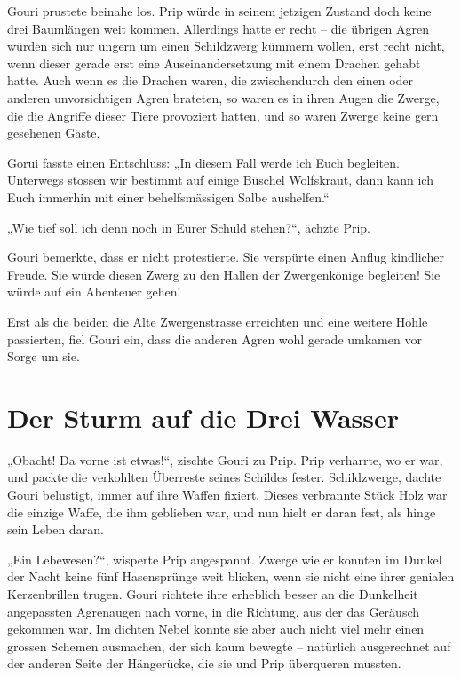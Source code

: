 Gouri prustete beinahe los. Prip würde in seinem jetzigen Zustand doch keine drei Baumlängen weit kommen. Allerdings hatte er recht – die übrigen Agren würden sich nur ungern um einen Schildzwerg kümmern wollen, erst recht nicht, wenn dieser gerade erst eine Auseinandersetzung mit einem Drachen gehabt hatte. Auch wenn es die Drachen waren, die zwischendurch den einen oder anderen unvorsichtigen Agren brateten, so waren es in ihren Augen die Zwerge, die die Angriffe dieser Tiere provoziert hatten, und so waren Zwerge keine gern gesehenen Gäste.

Gorui fasste einen Entschluss: „In diesem Fall werde ich Euch begleiten. Unterwegs stossen wir bestimmt auf einige Büschel Wolfskraut, dann kann ich Euch immerhin mit einer behelfsmässigen Salbe aushelfen.“

„Wie tief soll ich denn noch in Eurer Schuld stehen?“, ächzte Prip.

Gouri bemerkte, dass er nicht protestierte. Sie verspürte einen Anflug kindlicher Freude. Sie würde diesen Zwerg zu den Hallen der Zwergenkönige begleiten! Sie würde auf ein Abenteuer gehen!

Erst als die beiden die Alte Zwergenstrasse erreichten und eine weitere Höhle passierten, fiel Gouri ein, dass die anderen Agren wohl gerade umkamen vor Sorge um sie.






\newpage
\section{Der Sturm auf die Drei Wasser}

„Obacht! Da vorne ist etwas!“, zischte Gouri zu Prip. Prip verharrte, wo er war, und packte die verkohlten Überreste seines Schildes fester. Schildzwerge, dachte Gouri belustigt, immer auf ihre Waffen fixiert. Dieses verbrannte Stück Holz war die einzige Waffe, die ihm geblieben war, und nun hielt er daran fest, als hinge sein Leben daran.

„Ein Lebewesen?“, wisperte Prip angespannt. Zwerge wie er konnten im Dunkel der Nacht keine fünf Hasensprünge weit blicken, wenn sie nicht eine ihrer genialen Kerzenbrillen trugen. Gouri richtete ihre erheblich besser an die Dunkelheit angepassten Agrenaugen nach vorne, in die Richtung, aus der das Geräusch gekommen war. Im dichten Nebel konnte sie aber auch nicht viel mehr einen grossen Schemen ausmachen, der sich kaum bewegte – natürlich ausgerechnet auf der anderen Seite der Hängerücke, die sie und Prip überqueren mussten.

